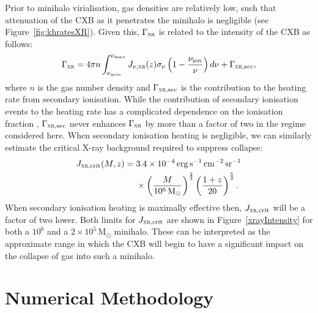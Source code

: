 \documentclass{thesis}
\newcommand{\s}{\ensuremath{\,\mathrm{s}}\xspace}
\newcommand{\cm}{\ensuremath{\,\mathrm{cm}}\xspace}
\newcommand{\msun}{\ensuremath{\,\mathrm{M}_{\odot}}\xspace}
\newcommand{\erg}{\ensuremath{\,\mathrm{erg}}\xspace}
\newcommand{\sr}{\ensuremath{\,\mathrm{sr}}\xspace}
\newcommand{\gxr}{\ensuremath{\Gamma_{\textsc{xr}}}\xspace}
\newcommand{\jxrvz}{\ensuremath{J_{\nu, \textsc{xr}}(z)}\xspace}
\newcommand{\jcrit}{\ensuremath{J_{\textsc{xr}, \mathrm{crit}}}\xspace}
\newcommand{\RefFig}[1]{\mbox{Figure~\ref{#1}}}
\newcommand{\RefSec}[1]{\mbox{Section~\ref{#1}}}
\begin{document}
Prior to minihalo virialisation, gas densities are relatively low, such that attenuation of the CXB as it penetrates the minihalo is negligible (see \RefFig{fig:khratesXR}). Given this, \gxr
is related to the intensity of the CXB as follows:
\begin{equation}
\gxr = 4\pi n \int_{\nu_{\mathrm min}}^{\nu_{\mathrm max}} \jxrvz \sigma_{\nu}
\left(1 - \frac{\nu_{\mathrm ion}}{\nu} \right) d\nu + \Gamma_{\textsc{xr}, \mathrm sec},
\end{equation}
where $n$ is the gas number density and $\Gamma_{\textsc{xr}, \mathrm sec}$ is the contribution to the heating rate from secondary ionisation. While the contribution of secondary ionisation events to the heating rate has a complicated dependence on the ionisation fraction \citep[][see \RefSec{xrays} for details]{ShullvanSteenberg1985}, $\Gamma_{\textsc{xr}, \mathrm sec}$ never enhances \gxr by more than a factor of two in the regime considered here.  When secondary ionisation heating is negligible, 
we can similarly estimate the critical X-ray background required to suppress collapse:
\begin{equation}
  \begin{split}
    \jcrit(M,z) = \; & 3.4 \times 10^{-4} \erg\s^{-1} \cm^{-2} \sr^{-1}\\ &\times \left(\frac{M}{10^6\msun}\right)^{\frac{2}{3}}
    \left(\frac{1+z}{20}\right)^{\frac{5}{2}}.
  \end{split}
\end{equation}
When secondary ionisation heating is maximally effective then, \jcrit will be a factor of two lower. Both limits for \jcrit are shown in \RefFig{xrayIntensity} for both a $10^6$  and a $2\times10^5\msun$ minihalo.  These can be interpreted as the approximate range in which the CXB will begin to have a significant impact on the collapse of gas into such a minihalo.


\section{Numerical Methodology}
\label{methods}
\end{document}
